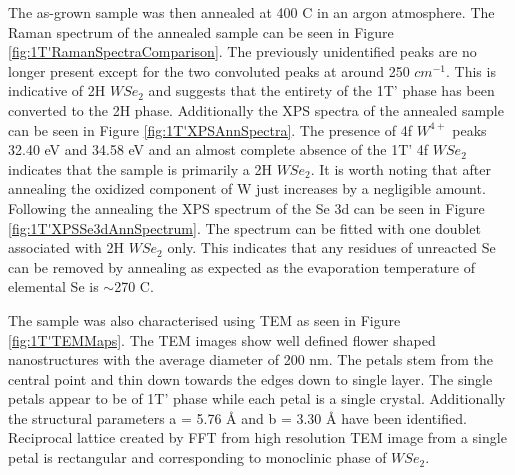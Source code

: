 The as-grown sample was then annealed at 400 {\degree}C in an argon atmosphere. The Raman spectrum of the annealed sample can be seen in Figure \ref{fig:1T'RamanSpectraComparison}. The previously unidentified peaks are no longer present except for the two convoluted peaks at around 250 $cm^{-1}$. This is indicative of 2H $WSe_2$ and suggests that the entirety of the 1T' phase has been converted to the 2H phase. Additionally the XPS spectra of the annealed sample can be seen in Figure \ref{fig:1T'XPSAnnSpectra}. The presence of 4f $W^{4+}$ peaks 32.40 eV and 34.58 eV and an almost complete absence of the 1T' 4f $WSe_2$ indicates that the sample is primarily a 2H $WSe_2$. It is worth noting that after annealing the oxidized component of W just increases by a negligible amount. Following the annealing the XPS spectrum of the Se 3d can be seen in Figure \ref{fig:1T'XPSSe3dAnnSpectrum}. The spectrum can be fitted with one doublet associated with 2H $WSe_2$ only. This indicates that any residues of unreacted Se can be removed by annealing as expected as the evaporation temperature of elemental Se is $\sim$270 {\degree}C. 

The sample was also characterised using TEM as seen in Figure \ref{fig:1T'TEMMaps}. The TEM images show well defined flower shaped nanostructures with the average diameter of 200 nm. The petals stem from the central point and thin down towards the edges down to single layer. The single petals appear to be of 1T' phase while each petal is a single crystal. Additionally the structural parameters a = 5.76 \r{A} and b = 3.30 \r{A} have been identified. Reciprocal lattice created by FFT from high resolution TEM image from a single petal is rectangular and corresponding to monoclinic phase of $WSe_2$.

